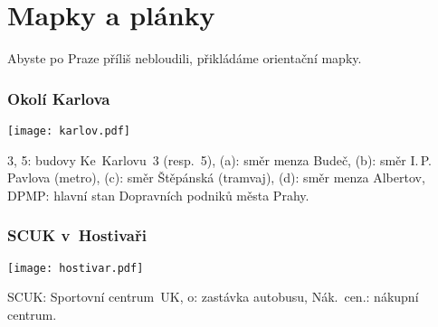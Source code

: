 \section{Mapky a plánky}
Abyste po Praze příliš nebloudili, přikládáme orientační mapky.

\subsubsection{Okolí Karlova}

\begin{center}\texttt{[image: karlov.pdf]}\end{center}

 3, 5: budovy Ke~Karlovu~3 (resp.~5),
(a): směr menza Budeč, (b): směr I.$\,$P.$\,$Pavlova (metro),
(c): směr Štěpánská (tramvaj), (d): směr menza Albertov,
DPMP: hlavní stan Dopravních podniků města Prahy.

\subsubsection{SCUK v~Hostivaři}
\begin{center}\texttt{[image: hostivar.pdf]}\end{center}

 SCUK: Sportovní centrum~UK, o: zastávka autobusu, Nák.~cen.: nákupní centrum.